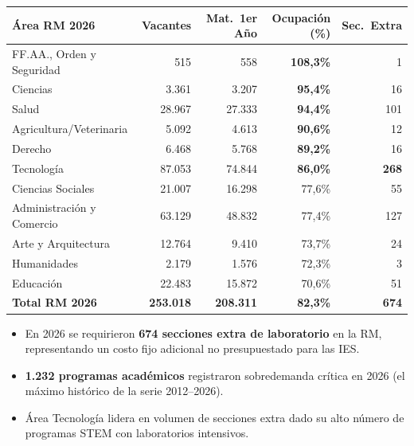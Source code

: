 \documentclass[11pt,a4paper]{article}
\begin{document}
\begin{center}\small
\begin{tabular}{@{}lrrrr@{}}
\toprule
\textbf{Área RM 2026} & \textbf{Vacantes} & \textbf{Mat.\ 1er Año} &
\textbf{Ocupación (\%)} & \textbf{Sec.\ Extra} \\
\midrule
FF.AA., Orden y Seguridad    &    515 &    558 & \textcolor{warnred}{\textbf{108,3\%}} &   1 \\
Ciencias                     &  3.361 &  3.207 & \textcolor{warnred}{\textbf{95,4\%}}  &  16 \\
Salud                        & 28.967 & 27.333 & \textcolor{warnred}{\textbf{94,4\%}}  & 101 \\
Agricultura/Veterinaria      &  5.092 &  4.613 & \textcolor{warnorange}{\textbf{90,6\%}} &  12 \\
Derecho                      &  6.468 &  5.768 & \textcolor{warnorange}{\textbf{89,2\%}} &  16 \\
Tecnología                   & 87.053 & 74.844 & \textcolor{warnorange}{\textbf{86,0\%}} & \textbf{268} \\
Ciencias Sociales            & 21.007 & 16.298 & 77,6\% &  55 \\
Administración y Comercio    & 63.129 & 48.832 & 77,4\% & 127 \\
Arte y Arquitectura          & 12.764 &  9.410 & 73,7\% &  24 \\
Humanidades                  &  2.179 &  1.576 & 72,3\% &   3 \\
Educación                    & 22.483 & 15.872 & 70,6\% &  51 \\
\midrule
\textbf{Total RM 2026} & \textbf{253.018} & \textbf{208.311} & \textbf{82,3\%} & \textbf{674} \\
\bottomrule
\end{tabular}
\end{center}

\begin{itemize}[leftmargin=*]
  \item En 2026 se requirieron \textbf{674 secciones extra de laboratorio} en la RM,
        representando un costo fijo adicional no presupuestado para las IES.
  \item \textbf{1.232 programas académicos} registraron sobredemanda crítica en 2026
        (el máximo histórico de la serie 2012--2026).
  \item Área Tecnología lidera en volumen de secciones extra dado su alto número de
        programas STEM con laboratorios intensivos.
\end{itemize}
\end{document}
